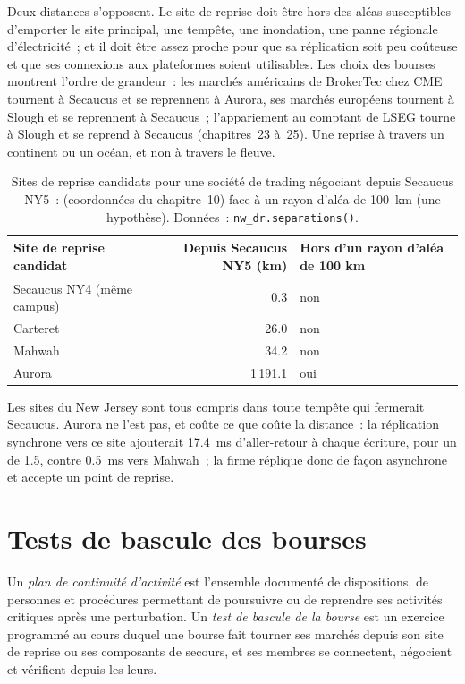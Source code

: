 Deux distances s'opposent. Le site de reprise doit être hors des aléas susceptibles d'emporter le site principal, une tempête, une
inondation, une panne régionale d'électricité~; et il doit être assez proche pour que sa réplication soit peu coûteuse et que ses connexions aux plateformes
soient utilisables. Les choix des bourses montrent l'ordre de grandeur~: les marchés américains de BrokerTec chez CME tournent à Secaucus et se reprennent à Aurora, ses
marchés européens tournent à Slough et se reprennent à Secaucus~; l'appariement au comptant de LSEG tourne à Slough et se reprend à Secaucus
(chapitres~23 à~25). Une reprise à travers un continent ou un océan, et non à travers le fleuve.

\begin{table}[ht]
\centering\small
\begin{tabular}{@{}lrl@{}}
\toprule
Site de reprise candidat & Depuis Secaucus NY5 (km) & Hors d'un rayon d'aléa de 100 km \\
\midrule
Secaucus NY4 (même campus) & 0.3 & non \\
Carteret & 26.0 & non \\
Mahwah & 34.2 & non \\
Aurora & 1\,191.1 & oui \\
\bottomrule
\end{tabular}
\caption{Sites de reprise candidats pour une société de trading négociant depuis Secaucus NY5~:  (coordonnées du chapitre~10) face à un
rayon d'aléa de \qty{100}{\kilo\metre} (une hypothèse). Données~: \texttt{nw\_dr.separations()}.}\label{tab:nw:disaster-recovery-and-regulatory-requirements:sites}
\end{table}

Les sites du New Jersey sont tous compris dans toute tempête qui fermerait Secaucus. Aurora ne l'est pas, et coûte ce que coûte la distance~: la réplication synchrone
vers ce site ajouterait \qty{17.4}{\milli\second} d'aller-retour à chaque écriture, pour un  de 1.5, contre
\qty{0.5}{\milli\second} vers Mahwah~; la firme réplique donc de façon asynchrone et accepte un point de reprise.

\section{Tests de bascule des bourses}

\begin{definition}\label{def:nw:disaster-recovery-and-regulatory-requirements:test}
Un \emph{plan de continuité d'activité} est l'ensemble documenté de dispositions, de personnes et
procédures permettant de poursuivre ou de reprendre ses activités critiques après une perturbation. Un
\emph{test de bascule de la bourse} est un exercice programmé au cours duquel une bourse fait tourner ses marchés depuis son site de reprise ou ses composants de secours, et ses
membres se connectent, négocient et vérifient depuis les leurs.
\end{definition}

